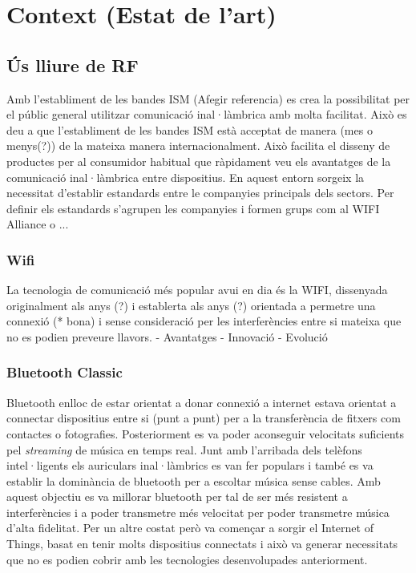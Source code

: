 \chapter{Context (Estat de l'art)}\label{C:compaginacio}

\section{Ús lliure de RF}
Amb l'establiment de les bandes ISM (Afegir referencia) es crea la possibilitat per el públic general utilitzar comunicació inal·làmbrica amb molta facilitat. Això es deu a que l'establiment de les bandes ISM està acceptat de manera (mes o menys(?)) de la mateixa manera internacionalment.
Això facilita el disseny de productes per al consumidor habitual que ràpidament veu els avantatges de la comunicació inal·làmbrica entre dispositius.
En aquest entorn sorgeix la necessitat d'establir estandards entre le companyies principals dels sectors. Per definir els estandards s'agrupen les companyies i formen grups com al WIFI Alliance o ...

\subsection{Wifi}
La tecnologia de comunicació més popular avui en dia és la WIFI, dissenyada originalment als anys (?) i establerta als anys (?) orientada a permetre una connexió (* bona) i sense consideració per les interferències entre si mateixa que no es podien preveure llavors.  
- Avantatges
- Innovació
- Evolució

\subsection{Bluetooth Classic}
Bluetooth enlloc de estar orientat a donar connexió a internet estava orientat a connectar dispositius entre si (punt a punt) per a la transferència de fitxers com contactes o fotografies.
Posteriorment es va poder aconseguir velocitats suficients pel \textit{streaming} de música en temps real.
Junt amb l'arribada dels telèfons intel·ligents els auriculars inal·làmbrics es van fer populars i també es va establir la dominància de bluetooth per a escoltar música sense cables.
Amb aquest objectiu es va millorar bluetooth per tal de ser més resistent a interferències i a poder transmetre més velocitat per poder transmetre música d'alta fidelitat.
Per un altre costat però va començar a sorgir el Internet of Things, basat en tenir molts dispositius connectats i això va generar necessitats que no es podien cobrir amb les tecnologies desenvolupades anteriorment.

